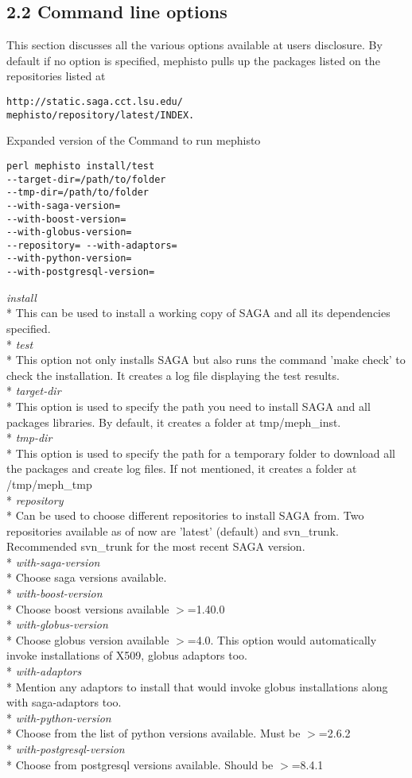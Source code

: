 \documentclass[a4paper,10pt]{article}
\begin{document}
\begin{multicols}{2}
\subsection*{\normalsize 2.2 Command line options}
This section discusses all the various options available at 
users disclosure. By default if no option is specified, mephisto 
pulls up the packages listed on the repositories listed at
\begin{verbatim} 
http://static.saga.cct.lsu.edu/
mephisto/repository/latest/INDEX. 
\end{verbatim}
Expanded version of the Command to run mephisto
\begin{verbatim} 
perl mephisto install/test 
--target-dir=/path/to/folder 
--tmp-dir=/path/to/folder 
--with-saga-version= 
--with-boost-version= 
--with-globus-version= 
--repository= --with-adaptors= 
--with-python-version= 
--with-postgresql-version=
\end{verbatim} 
\emph{install} \\*
 This can be used to install a working copy of SAGA and all its 
 dependencies specified. \\*
\emph{test} \\*
 This option not only installs SAGA but also runs the command 
 'make check' to check the installation. It creates a log file displaying 
 the test results. \\*
\emph{target-dir} \\*
 This option is used to specify the path you need to install SAGA and all 
 packages libraries. By default, it creates a folder at tmp/meph\_inst.\\*
\emph{tmp-dir} \\*
 This option is used to specify the path for a temporary folder to 
 download all the packages and create log files. If not mentioned, it 
 creates a folder at /tmp/meph\_tmp\\*
\emph{repository} \\*
 Can be used to choose different repositories to install SAGA from. 
 Two repositories available as of now are 'latest' (default) and svn\_trunk. 
 Recommended svn\_trunk for the most recent SAGA version. \\*
\emph{with-saga-version}\\*
 Choose saga versions available.\\*
\emph{with-boost-version}\\*
Choose boost versions available $>$=1.40.0\\*
\emph{with-globus-version} \\*
 Choose globus version available $>$=4.0. This option would automatically 
 invoke installations of X509, globus adaptors too. \\*
\emph{with-adaptors}\\*
 Mention any adaptors to install that would invoke globus installations along with 
 saga-adaptors too. \\*
 \emph{with-python-version}\\*
 Choose from the list of python versions available. Must be 
 $>$=2.6.2 \\*
 \emph{with-postgresql-version}\\*
 Choose from postgresql versions available. Should be $>$=8.4.1

\end{multicols}
\end{document}
